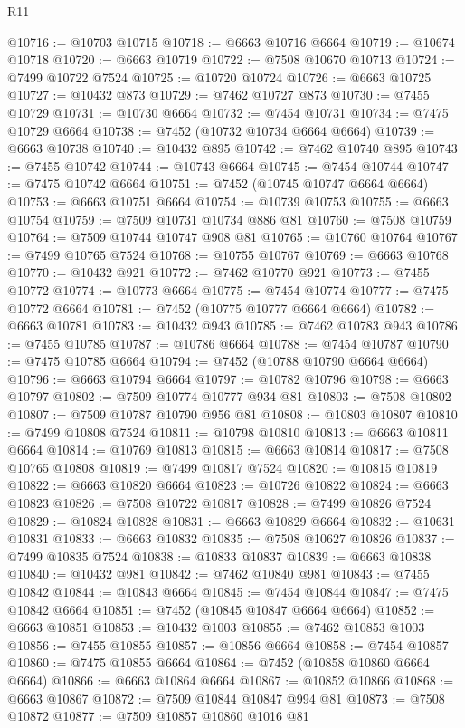 \begin{lexlean}{R11}
\begin{coremodule}
@10716 := @10703 @10715
@10718 := @6663 @10716 @6664
@10719 := @10674 @10718
@10720 := @6663 @10719
@10722 := @7508 @10670 @10713
@10724 := @7499 @10722 @7524
@10725 := @10720 @10724
@10726 := @6663 @10725
@10727 := @10432 @873
@10729 := @7462 @10727 @873
@10730 := @7455 @10729
@10731 := @10730 @6664
@10732 := @7454 @10731
@10734 := @7475 @10729 @6664
@10738 := @7452 (@10732 @10734 @6664 @6664)
@10739 := @6663 @10738
@10740 := @10432 @895
@10742 := @7462 @10740 @895
@10743 := @7455 @10742
@10744 := @10743 @6664
@10745 := @7454 @10744
@10747 := @7475 @10742 @6664
@10751 := @7452 (@10745 @10747 @6664 @6664)
@10753 := @6663 @10751 @6664
@10754 := @10739 @10753
@10755 := @6663 @10754
@10759 := @7509 @10731 @10734 @886 @81
@10760 := @7508 @10759
@10764 := @7509 @10744 @10747 @908 @81
@10765 := @10760 @10764
@10767 := @7499 @10765 @7524
@10768 := @10755 @10767
@10769 := @6663 @10768
@10770 := @10432 @921
@10772 := @7462 @10770 @921
@10773 := @7455 @10772
@10774 := @10773 @6664
@10775 := @7454 @10774
@10777 := @7475 @10772 @6664
@10781 := @7452 (@10775 @10777 @6664 @6664)
@10782 := @6663 @10781
@10783 := @10432 @943
@10785 := @7462 @10783 @943
@10786 := @7455 @10785
@10787 := @10786 @6664
@10788 := @7454 @10787
@10790 := @7475 @10785 @6664
@10794 := @7452 (@10788 @10790 @6664 @6664)
@10796 := @6663 @10794 @6664
@10797 := @10782 @10796
@10798 := @6663 @10797
@10802 := @7509 @10774 @10777 @934 @81
@10803 := @7508 @10802
@10807 := @7509 @10787 @10790 @956 @81
@10808 := @10803 @10807
@10810 := @7499 @10808 @7524
@10811 := @10798 @10810
@10813 := @6663 @10811 @6664
@10814 := @10769 @10813
@10815 := @6663 @10814
@10817 := @7508 @10765 @10808
@10819 := @7499 @10817 @7524
@10820 := @10815 @10819
@10822 := @6663 @10820 @6664
@10823 := @10726 @10822
@10824 := @6663 @10823
@10826 := @7508 @10722 @10817
@10828 := @7499 @10826 @7524
@10829 := @10824 @10828
@10831 := @6663 @10829 @6664
@10832 := @10631 @10831
@10833 := @6663 @10832
@10835 := @7508 @10627 @10826
@10837 := @7499 @10835 @7524
@10838 := @10833 @10837
@10839 := @6663 @10838
@10840 := @10432 @981
@10842 := @7462 @10840 @981
@10843 := @7455 @10842
@10844 := @10843 @6664
@10845 := @7454 @10844
@10847 := @7475 @10842 @6664
@10851 := @7452 (@10845 @10847 @6664 @6664)
@10852 := @6663 @10851
@10853 := @10432 @1003
@10855 := @7462 @10853 @1003
@10856 := @7455 @10855
@10857 := @10856 @6664
@10858 := @7454 @10857
@10860 := @7475 @10855 @6664
@10864 := @7452 (@10858 @10860 @6664 @6664)
@10866 := @6663 @10864 @6664
@10867 := @10852 @10866
@10868 := @6663 @10867
@10872 := @7509 @10844 @10847 @994 @81
@10873 := @7508 @10872
@10877 := @7509 @10857 @10860 @1016 @81

\end{coremodule}
\end{lexlean}

